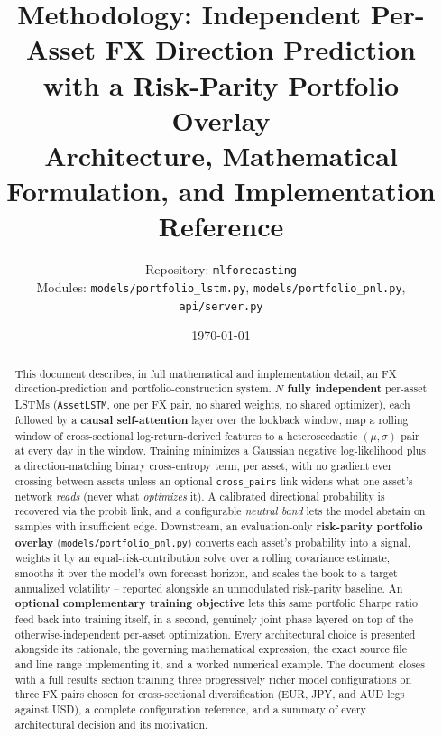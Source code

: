 \documentclass[11pt]{article}
\title{\vspace{-1.5cm}\textbf{Methodology: Independent Per-Asset FX Direction Prediction\\ with a Risk-Parity Portfolio Overlay}\\[6pt]
\large Architecture, Mathematical Formulation, and Implementation Reference}
\author{Repository: \texttt{mlforecasting} \\ Modules: \texttt{models/portfolio\_lstm.py}, \texttt{models/portfolio\_pnl.py}, \texttt{api/server.py}}
\date{\today}
\begin{document}
\maketitle
\thispagestyle{empty}

\begin{abstract}
\noindent
This document describes, in full mathematical and implementation detail, an FX
direction-prediction and portfolio-construction system. $N$ \textbf{fully independent}
per-asset LSTMs (\texttt{AssetLSTM}, one per FX pair, no shared weights, no shared
optimizer), each followed by a \textbf{causal self-attention} layer over the lookback
window, map a rolling window of cross-sectional log-return-derived features to a
heteroscedastic $(\mu,\sigma)$ pair at every day in the window. Training minimizes a
Gaussian negative log-likelihood plus a direction-matching binary cross-entropy term, per
asset, with no gradient ever crossing between assets unless an optional
\texttt{cross\_pairs} link widens what one asset's network \emph{reads} (never what
\emph{optimizes} it). A calibrated directional probability is recovered via the probit
link, and a configurable \emph{neutral band} lets the model abstain on samples with
insufficient edge. Downstream, an evaluation-only \textbf{risk-parity portfolio overlay}
(\texttt{models/portfolio\_pnl.py}) converts each asset's probability into a signal,
weights it by an equal-risk-contribution solve over a rolling covariance estimate, smooths
it over the model's own forecast horizon, and scales the book to a target annualized
volatility -- reported alongside an unmodulated risk-parity baseline. An
\textbf{optional complementary training objective} lets this same portfolio Sharpe ratio
feed back into training itself, in a second, genuinely joint phase layered on top of the
otherwise-independent per-asset optimization. Every architectural choice is presented
alongside its rationale, the governing mathematical expression, the exact source file and
line range implementing it, and a worked numerical example. The document closes with a
full results section training three progressively richer model configurations on three
FX pairs chosen for cross-sectional diversification (EUR, JPY, and AUD legs against USD),
a complete configuration reference, and a summary of every architectural decision and its
motivation.
\end{abstract}

\vspace{0.3cm}
\tableofcontents
\newpage

\end{document}
